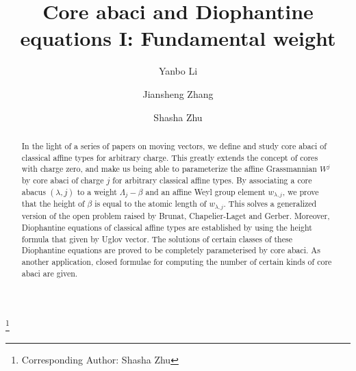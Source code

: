 \documentclass[11pt]{amsart}
\theoremstyle{plain}
\numberwithin{equation}{subsection}
\newcommand{\lam}{\lambda}
\begin{document}
\title[Core abaci and Diophantine equations I]
{Core abaci and Diophantine equations I: Fundamental weight}

\thanks{Corresponding Author: Shasha Zhu}

\author{Yanbo Li}

\address{Li: School of Mathematics and Statistics, Northeastern
University at Qinhuangdao, Qinhuangdao, 066004, P.R. China}


\author{Jiansheng Zhang}

\address{Zhang: Department of mathematics, School of Science, Northeastern
University, Shenyang, 110819, P.R. China}


\author{Shasha Zhu}

\address{Zhu: Department of mathematics, School of Science, Northeastern
University, Shenyang, 110819, P.R. China}


\begin{abstract}
In the light of a series of papers on moving vectors, we define and study core abaci of classical affine types for arbitrary charge.
This greatly extends the concept of cores with charge zero, and make us being able to parameterize the affine Grassmannian $W^j$ 
by core abaci of charge $j$ for arbitrary classical affine types.
By associating a core abacus $(\lam, j)$ to a weight $\Lambda_j-\beta$ and an affine Weyl group element $w_{\lam, j}$, we prove that the height of $\beta$ 
is equal to the atomic length of $w_{\lam, j}$.
This solves a generalized version of the open problem raised by Brunat, Chapelier-Laget and Gerber.
Moreover, Diophantine equations of classical affine types
are established by using the height formula that given by Uglov vector. 
The solutions of certain classes of these Diophantine equations are proved to be completely parameterised by core abaci. 
As another application, closed formulae for computing the number of certain kinds of core abaci are given.
\end{abstract}




\maketitle
\end{document}
